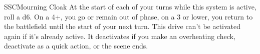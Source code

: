 \begin{mech}{SSC}{Mourning Cloak}
At the start of each of your turns while this system is active, roll a d6. On a 4+, you go or remain out of phase, on a 3 or lower, you return to the battlefield until the start of your next turn. This drive can’t be activated again if it’s already active. It deactivates if you make an overheating check, deactivate as a quick action, or the scene ends.
\end{mech}